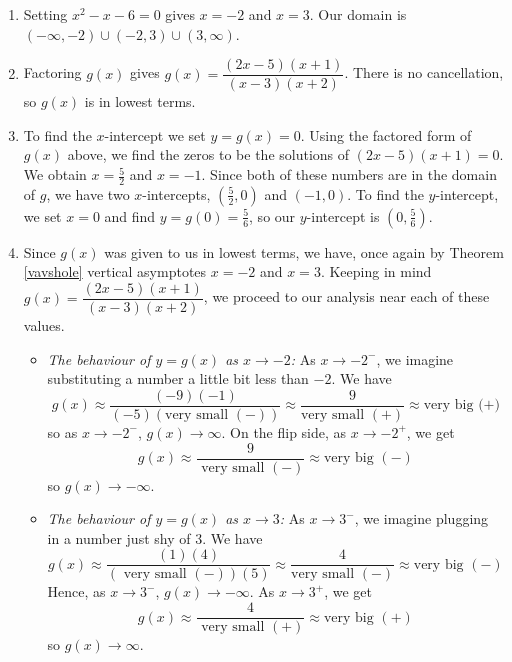 {
\begin{enumerate}

\item  Setting $x^2-x-6 = 0$ gives $x = -2$ and $x=3$.  Our domain is $(-\infty, -2) \cup (-2,3) \cup (3,\infty)$.

\item  Factoring $g(x)$ gives $g(x) = \dfrac{(2x-5)(x+1)}{(x-3)(x+2)}$.  There is no cancellation, so $g(x)$ is in lowest terms.

\item  To find the $x$-intercept  we set $y = g(x) = 0$.  Using the factored form of $g(x)$ above, we find the zeros to be the solutions of $(2x-5)(x+1)=0$.  We obtain $x = \frac{5}{2}$ and $x=-1$. Since both of these numbers are in the domain of $g$, we have two $x$-intercepts, $\left( \frac{5}{2},0\right)$ and $(-1,0)$.  To find the $y$-intercept, we set $x=0$ and find $y = g(0) = \frac{5}{6}$, so our $y$-intercept is $\left(0, \frac{5}{6}\right)$.

\item  Since $g(x)$ was given to us in lowest terms, we have, once again by Theorem \ref{vavshole} vertical asymptotes $x=-2$ and $x=3$.  Keeping in mind $g(x) = \dfrac{(2x-5)(x+1)}{(x-3)(x+2)}$, we proceed to our analysis near each of these values.

\begin{itemize}

\item  \textit{The behaviour of $y=g(x)$ as $x \rightarrow -2$:}  As $x \rightarrow -2^{-}$, we imagine substituting a number a little bit less than $-2$. We have \[g(x) \approx \frac{(-9)(-1)}{(-5)(\mbox{very small $(-)$})} \approx \frac{9}{\mbox{very small $(+)$}} \approx \mbox{very big (+)}\] so as $x \rightarrow -2^{-}$, $g(x) \rightarrow \infty$. On the flip side, as $x \rightarrow -2^{+}$, we get \[g(x) \approx \frac{9}{\mbox{ very small $(-)$}} \approx \mbox{very big $(-)$}\] so $g(x) \rightarrow -\infty$.

\item  \textit{The behaviour of $y=g(x)$ as $x \rightarrow 3$:}  As $x \rightarrow 3^{-}$, we imagine plugging in a number just shy  of $3$. We have \[g(x) \approx \frac{(1)(4)}{(\mbox{ very small $(-)$}) (5)} \approx \frac{4}{\mbox{very small $(-)$}} \approx \mbox{very big $(-)$}\] Hence, as $x \rightarrow 3^{-}$, $g(x) \rightarrow -\infty$. As $x \rightarrow 3^{+}$, we get \[g(x) \approx \frac{4}{\mbox{ very small $(+)$}} \approx \mbox{very big $(+)$}\] so $g(x) \rightarrow \infty$.


\end{itemize}
\end{enumerate}}
